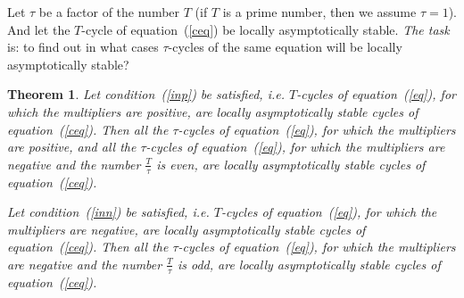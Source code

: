 \documentclass[12pt,a4paper]{amsart}
\newtheorem{theorem}{Theorem}
\begin{document}
Let $\tau$ be a factor of the number $T$ (if $T$ is a prime number, then we assume $\tau=1$). And let the $T$-cycle of equation~(\ref{ceq}) 
be locally asymptotically stable. \textit{The task} is: to find out in what cases $\tau$-cycles of the same equation will be locally asymptotically stable?

\begin{theorem}\label{t4}
Let condition~(\ref{inp}) be satisfied, i.e. $T$-cycles of equation~(\ref{eq}), for which the multipliers are positive, are locally asymptotically stable cycles 
of equation~(\ref{ceq}). Then all the $\tau$-cycles of equation~(\ref{eq}), for which the multipliers are positive, and all the $\tau$-cycles of 
equation~(\ref{eq}), for which the multipliers are negative and the number $\frac{T}{\tau}$ is even, are locally asymptotically stable cycles of 
equation~(\ref{ceq}).

Let condition~(\ref{inn}) be satisfied, i.e. $T$-cycles of equation~(\ref{eq}), for which the multipliers are negative, are locally asymptotically stable cycles 
of equation~(\ref{ceq}). Then all the $\tau$-cycles of equation~(\ref{eq}), for which the multipliers are negative and the number $\frac{T}{\tau}$ is odd, 
are locally asymptotically stable cycles of equation~(\ref{ceq}).
\end{theorem}
\end{document}
